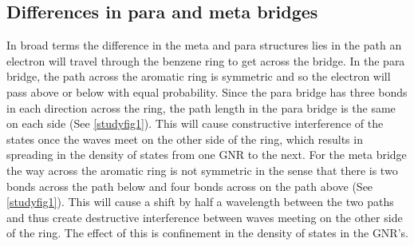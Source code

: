 \subsection{Differences in para and meta bridges}
In broad terms the difference in the meta and para structures lies in the path an electron will travel through the benzene ring to get across the bridge. In the para bridge, the path across the aromatic ring is symmetric and so the electron will pass above or below with equal probability. Since the para bridge has three bonds in each direction across the ring, the path length in the para bridge is the same on each side (See \cref{studyfig1}). This will cause constructive interference of the states once the waves meet on the other side of the ring, which results in spreading in the density of states from one GNR to the next. For the meta bridge the way across the aromatic ring is not symmetric in the sense that there is two bonds across the path below and four bonds across on the path above (See \cref{studyfig1}). This will cause a shift by half a wavelength between the two paths and thus create destructive interference between waves meeting on the other side of the ring. The effect of this is confinement in the density of states in the GNR's. 
